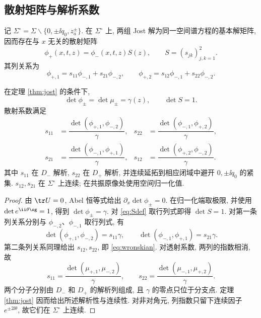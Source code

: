\subsection{散射矩阵与解析系数}
记 $\Sigma^\circ=\Sigma\mathbin{\backslash}\{0,\pm\ii q_0,z_a^\pm\}$. 在 $\Sigma^\circ$ 上, 两组 Jost 解为同一空间谱方程的基本解矩阵, 因而存在与 $x$ 无关的散射矩阵
\begin{equation}\label{eq:Sdef}
\phi_+(x,t,z)=\phi_-(x,t,z)S(z),\qquad S=(s_{jk})_{j,k=1}^{2}.
\end{equation}
其列关系为
\begin{equation}\label{eq:scattering-columns}
\phi_{+,1}=s_{11}\phi_{-,1}+s_{21}\phi_{-,2},\qquad
\phi_{+,2}=s_{12}\phi_{-,1}+s_{22}\phi_{-,2}.
\end{equation}

\begin{proposition}\label{prop:scattering}
在定理 \ref{thm:jost} 的条件下,
\begin{equation}\label{eq:detjost}
\det\phi_\pm=\det\mu_\pm=\gamma(z),\qquad \det S=1.
\end{equation}
散射系数满足
\begin{align}
s_{11}&=\dfrac{\det(\phi_{+,1},\phi_{-,2})}{\gamma},&
s_{22}&=\dfrac{\det(\phi_{-,1},\phi_{+,2})}{\gamma},\label{eq:wronskian}\\
s_{21}&=\dfrac{\det(\phi_{-,1},\phi_{+,1})}{\gamma},&
s_{12}&=\dfrac{\det(\phi_{+,2},\phi_{-,2})}{\gamma}.\nonumber
\end{align}
其中 $s_{11}$ 在 $D_-$ 解析, $s_{22}$ 在 $D_+$ 解析, 并连续延拓到相应闭域中避开 $0,\pm\ii q_0$ 的紧集. $s_{12},s_{21}$ 在 $\Sigma^\circ$ 上连续; 在共振原像处使用空间归一化值.
\end{proposition}
\begin{proof}
由 $\tr U=0$, Abel 恒等式给出 $\partial_x\det\phi_\pm=0$. 在归一化端取极限, 并使用 $\det e^{\ii\theta\sg}=1$, 得到 $\det\phi_\pm=\gamma$. 对 \eqref{eq:Sdef} 取行列式即得 $\det S=1$. 对第一条列关系分别与 $\phi_{-,2}$、$\phi_{-,1}$ 取行列式, 有
\[
\det(\phi_{+,1},\phi_{-,2})=s_{11}\gamma,\qquad
\det(\phi_{-,1},\phi_{+,1})=s_{21}\gamma.
\]
第二条列关系同理给出 $s_{12},s_{22}$, 即 \eqref{eq:wronskian}. 对透射系数, 两列的指数相消, 故
\[
s_{11}=\dfrac{\det(\mu_{+,1},\mu_{-,2})}{\gamma},\qquad
s_{22}=\dfrac{\det(\mu_{-,1},\mu_{+,2})}{\gamma}.
\]
两个分子分别由 $D_-$ 和 $D_+$ 的解析列组成, 且 $\gamma$ 的零点只位于分支点. 定理 \ref{thm:jost} 因而给出所述解析性与连续性. 对非对角元, 列指数只留下连续因子 $e^{\pm2\ii\theta}$, 故它们在 $\Sigma^\circ$ 上连续.
\end{proof}

